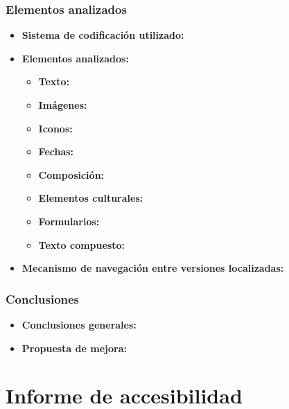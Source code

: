 \documentclass[a4paper,11pt]{article}
\begin{document}
\subsubsection{Elementos analizados}
\begin{itemize}
\item \textbf{Sistema de codificación utilizado:}\\
\item \textbf{Elementos analizados:}\\
\begin{itemize}
  \item \textbf{Texto:}\\
  \item \textbf{Imágenes:}\\
  \item \textbf{Iconos:}\\
  \item \textbf{Fechas:}\\
  \item \textbf{Composición:}\\
  \item \textbf{Elementos culturales:}\\
  \item \textbf{Formularios:}\\
  \item \textbf{Texto compuesto:}\\
\end{itemize}

\item \textbf{Mecanismo de navegación entre versiones localizadas:}\\
\end{itemize}

\subsubsection{Conclusiones}
\begin{itemize}
\item \textbf{Conclusiones generales:}\\
\item \textbf{Propuesta de mejora:}\\

\end{itemize}

\section{Informe de accesibilidad}
\end{document}
